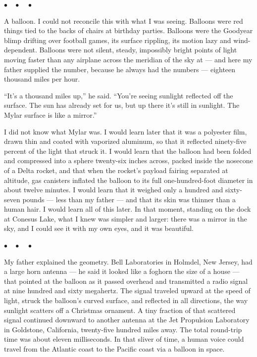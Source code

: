 \documentclass[12pt, letterpaper]{article}
\begin{document}
\begin{center}
$\bullet\quad\bullet\quad\bullet$
\end{center}

A balloon. I could not reconcile this with what I was seeing. Balloons were red things tied to the backs of chairs at birthday parties. Balloons were the Goodyear blimp drifting over football games, its surface rippling, its motion lazy and wind-dependent. Balloons were not silent, steady, impossibly bright points of light moving faster than any airplane across the meridian of the sky at --- and here my father supplied the number, because he always had the numbers --- eighteen thousand miles per hour.

``It's a thousand miles up,'' he said. ``You're seeing sunlight reflected off the surface. The sun has already set for us, but up there it's still in sunlight. The Mylar surface is like a mirror.''

I did not know what Mylar was. I would learn later that it was a polyester film, drawn thin and coated with vaporized aluminum, so that it reflected ninety-five percent of the light that struck it. I would learn that the balloon had been folded and compressed into a sphere twenty-six inches across, packed inside the nosecone of a Delta rocket, and that when the rocket's payload fairing separated at altitude, gas canisters inflated the balloon to its full one-hundred-foot diameter in about twelve minutes. I would learn that it weighed only a hundred and sixty-seven pounds --- less than my father --- and that its skin was thinner than a human hair. I would learn all of this later. In that moment, standing on the dock at Conesus Lake, what I knew was simpler and larger: there was a mirror in the sky, and I could see it with my own eyes, and it was beautiful.

\begin{center}
$\bullet\quad\bullet\quad\bullet$
\end{center}

My father explained the geometry. Bell Laboratories in Holmdel, New Jersey, had a large horn antenna --- he said it looked like a foghorn the size of a house --- that pointed at the balloon as it passed overhead and transmitted a radio signal at nine hundred and sixty megahertz. The signal traveled upward at the speed of light, struck the balloon's curved surface, and reflected in all directions, the way sunlight scatters off a Christmas ornament. A tiny fraction of that scattered signal continued downward to another antenna at the Jet Propulsion Laboratory in Goldstone, California, twenty-five hundred miles away. The total round-trip time was about eleven milliseconds. In that sliver of time, a human voice could travel from the Atlantic coast to the Pacific coast via a balloon in space.
\end{document}
